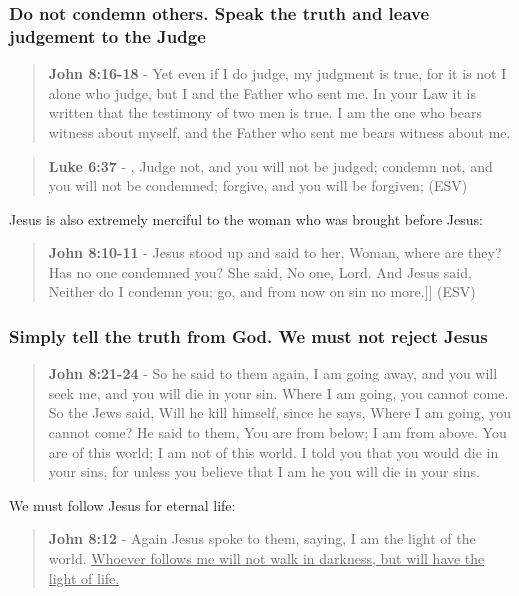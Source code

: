 \documentclass[11pt]{article}
\begin{document}
\subsubsection{Do not condemn others. Speak the truth and leave judgement to the Judge}
\label{sec:org0f4ead5}
\begin{quote}
\textbf{John 8:16-18} - Yet even if I do judge, my judgment is true, for it is not I alone who judge, but I and the Father who sent me. In your Law it is written that the testimony of two men is true. I am the one who bears witness about myself, and the Father who sent me bears witness about me.
\end{quote}

\begin{quote}
\textbf{Luke 6:37} - , Judge not, and you will not be judged; condemn not, and you will not be condemned; forgive, and you will be forgiven; (ESV)
\end{quote}

Jesus is also extremely merciful to the woman who was brought before Jesus:

\begin{quote}
\textbf{John 8:10-11} - Jesus stood up and said to her, Woman, where are they? Has no one condemned you? She said, No one, Lord. And Jesus said, Neither do I condemn you; go, and from now on sin no more.]] (ESV)
\end{quote}

\subsubsection{Simply tell the truth from God. We must not reject Jesus}
\label{sec:org0d2d849}
\begin{quote}
\textbf{John 8:21-24} - So he said to them again, I am going away, and you will seek me, and you will die in your sin. Where I am going, you cannot come. So the Jews said, Will he kill himself, since he says, Where I am going, you cannot come? He said to them, You are from below; I am from above. You are of this world; I am not of this world. I told you that you would die in your sins, for unless you believe that I am he you will die in your sins.
\end{quote}

We must follow Jesus for eternal life:

\begin{quote}
\textbf{John 8:12} - Again Jesus spoke to them, saying, I am the light of the world. \uline{Whoever follows me will not walk in darkness, but will have the light of life.}
\end{quote}
\end{document}
